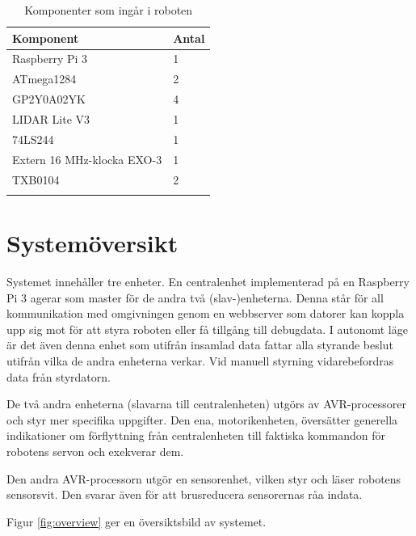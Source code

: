 \documentclass[a4paper,titlepage,12pt]{article}
\begin{document}
	\begin{longtable}[c]{l l}
		\textbf{Komponent} & \textbf{Antal} \\ \midrule
		Raspberry Pi 3 & 1 \\
		ATmega1284 & 2 \\
		GP2Y0A02YK & 4 \\
		LIDAR Lite V3 & 1 \\
		74LS244 & 1 \\
		Extern 16 MHz-klocka EXO-3 & 1 \\
		TXB0104 & 2 \\
		\caption{Komponenter som ingår i roboten \label{table:components}}
	\end{longtable}


	\section{Systemöversikt}
	Systemet innehåller tre enheter. En centralenhet implementerad på en Raspberry Pi 3 
	agerar som master för de andra två (slav-)enheterna. Denna står för all kommunikation 
	med omgivningen genom en webbserver som datorer kan koppla upp sig mot för att styra roboten 
	eller få tillgång till debugdata. I autonomt läge är det även denna enhet som utifrån 
	insamlad data fattar alla styrande beslut utifrån vilka de andra enheterna 
	verkar. Vid manuell styrning vidarebefordras data från styrdatorn.

	De två andra enheterna (slavarna till centralenheten) utgörs av AVR-processorer och styr 
	mer specifika uppgifter. Den ena, motorikenheten, översätter generella indikationer om 
	förflyttning från centralenheten till faktiska kommandon för robotens
    servon och exekverar dem.
    
    Den andra AVR-processorn utgör en sensorenhet, vilken styr och läser
    robotens sensorsvit.  Den svarar även för att brusreducera sensorernas råa indata. 
    
    Figur \ref{fig:overview} ger en översiktsbild av systemet.
	
\end{document}
